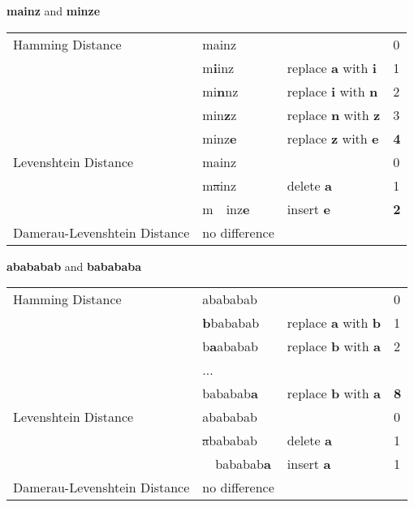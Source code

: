 \documentclass[10pt,a4paper]{article}
\begin{document}
\begin{enumerate}
        \textbf{mainz} and \textbf{minze}\\
        \begin{tabular}{llll}
             Hamming Distance               &mainz&&0\\
                                            &m\textbf{i}inz &replace \textbf{a} with \textbf{i} & 1\\
                                            &mi\textbf{n}nz &replace \textbf{i} with \textbf{n} & 2\\
                                            &min\textbf{z}z &replace \textbf{n} with \textbf{z} & 3\\
                                            &minz\textbf{e} &replace \textbf{z} with \textbf{e} & \textbf{4}\\
             Levenshtein Distance           &mainz&&0\\
                                            &m\sout{a}inz &delete \textbf{a}& 1\\
                                            &m\ \ inz\textbf{e} &insert \textbf{e}& \textbf{2}\\
             Damerau-Levenshtein Distance   &no difference\\
        \end{tabular}
    
        \textbf{abababab} and \textbf{babababa}\\
        \begin{tabular}{llll}
             Hamming Distance               &abababab&&0\\
                                            &\textbf{b}bababab &replace \textbf{a} with \textbf{b} & 1\\
                                            &b\textbf{a}ababab &replace \textbf{b} with \textbf{a} & 2\\
                                            &...\\
                                            &bababab\textbf{a} &replace \textbf{b} with \textbf{a} & \textbf{8}\\
             Levenshtein Distance           &abababab&&0\\
                                            &\sout{a}bababab &delete \textbf{a}& 1\\
                                            &\ \ bababab\textbf{a} &insert \textbf{a}& 1\\
             Damerau-Levenshtein Distance   &no difference\\
        \end{tabular}
\end{enumerate}
\end{document}
